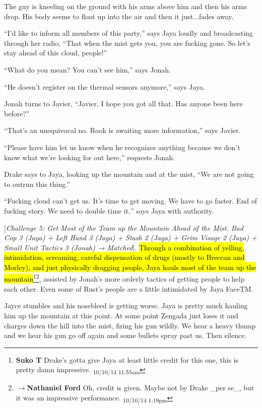 The guy is kneeling on the ground with his arms above him and then his arms drop.  His body seems to float up into the air and then it just...fades away.

``I'd like to inform all members of this party,'' says Jaya loudly and broadcasting through her radio, ``That when the mist gets you, you are fucking gone.  So let's stay ahead of this cloud, people!''

``What do you mean?  You can't see him,'' says Jonah.

``He doesn't register on the thermal sensors anymore,'' says Jaya.

Jonah turns to Javier, ``Javier, I hope you got all that.  Has anyone been here before?''

``That's an unequivocal no.  Rook is awaiting more information,'' says Javier.

``Please have him let us know when he recognizes anything because we don't know what we're looking for out here,'' requests Jonah.

Drake says to Jaya, looking up the mountain and at the mist, ``We are not going to outrun this thing.''

``Fucking cloud can't get us. It's time to get moving.  We have to go faster.  End of fucking story.  We need to double time it,'' says Jaya with authority.



{[}\textit{Challenge 5: Get Most of the Team up the Mountain Ahead of the Mist.  Bad Cop 3 (Jaya) + Left Hand 3 (Jaya) + Stash 2 (Jaya) + Grim Visage 2 (Jaya) + Small Unit Tactics 3 (Jonah) → Matched}{]}.  \hl{Through a combination of yelling, intimidation, screaming, careful dispensation of drugs (mostly to Breccan and Morley), and just physically dragging people, Jaya hauls most of the team up the mountain}\footnote{\textbf{Suko T }Drake's gotta give Jaya at least little credit for this one, this is pretty damn impressive. \textsubscript{10/10/14 11:55am}}\footnote{$\rightarrow$\textbf{Nathaniel Ford }Oh, credit is given. Maybe not by Drake \_per se\_, but it was an impressive performance. \textsubscript{10/10/14 1:19pm}}, assisted by Jonah's more orderly tactics of getting people to help each other.  Even some of Rust's people are a little intimidated by Jaya FaceTM.



Jayce stumbles and his nosebleed is getting worse.  Jaya is pretty much hauling him up the mountain at this point.   At some point Zengada just loses it and charges down the hill into the mist, firing his gun wildly.  We hear a heavy thump and we hear his gun go off again and some bullets spray past us. Then silence.  

